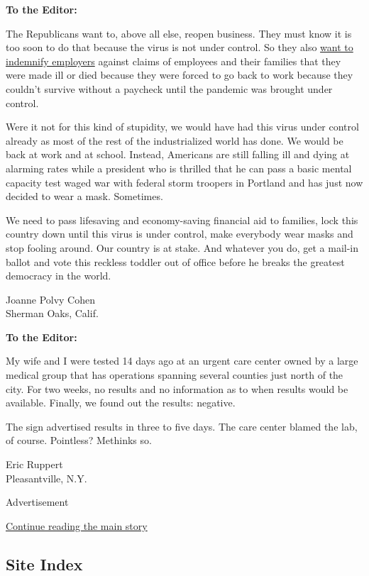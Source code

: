 \textbf{To the Editor:}

The Republicans want to, above all else, reopen business. They must know
it is too soon to do that because the virus is not under control. So
they also
\href{https://www.nytimes.com/2020/06/12/business/economy/coronavirus-liability-shield.html}{want
to indemnify employers} against claims of employees and their families
that they were made ill or died because they were forced to go back to
work because they couldn't survive without a paycheck until the pandemic
was brought under control.

Were it not for this kind of stupidity, we would have had this virus
under control already as most of the rest of the industrialized world
has done. We would be back at work and at school. Instead, Americans are
still falling ill and dying at alarming rates while a president who is
thrilled that he can pass a basic mental capacity test waged war with
federal storm troopers in Portland and has just now decided to wear a
mask. Sometimes.

We need to pass lifesaving and economy-saving financial aid to families,
lock this country down until this virus is under control, make everybody
wear masks and stop fooling around. Our country is at stake. And
whatever you do, get a mail-in ballot and vote this reckless toddler out
of office before he breaks the greatest democracy in the world.

Joanne Polvy Cohen\\
Sherman Oaks, Calif.

\textbf{To the Editor:}

My wife and I were tested 14 days ago at an urgent care center owned by
a large medical group that has operations spanning several counties just
north of the city. For two weeks, no results and no information as to
when results would be available. Finally, we found out the results:
negative.

The sign advertised results in three to five days. The care center
blamed the lab, of course. Pointless? Methinks so.

Eric Ruppert\\
Pleasantville, N.Y.

Advertisement

\protect\hyperlink{after-bottom}{Continue reading the main story}

\hypertarget{site-index}{%
\subsection{Site Index}\label{site-index}}

